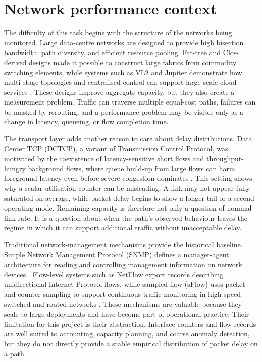 \section{Network performance context}

The difficulty of this task begins with the structure of the networks being monitored. Large data-centre networks are designed to provide high bisection bandwidth, path diversity, and efficient resource pooling. Fat-tree and Clos-derived designs made it possible to construct large fabrics from commodity switching elements, while systems such as VL2 and Jupiter demonstrate how multi-stage topologies and centralised control can support large-scale cloud services \cite{alFaresFatTree,greenbergVl2,singhJupiter}. These designs improve aggregate capacity, but they also create a measurement problem. Traffic can traverse multiple equal-cost paths, failures can be masked by rerouting, and a performance problem may be visible only as a change in latency, queueing, or flow completion time.

The transport layer adds another reason to care about delay distributions. Data Center TCP (DCTCP), a variant of Transmission Control Protocol, was motivated by the coexistence of latency-sensitive short flows and throughput-hungry background flows, where queue build-up from large flows can harm foreground latency even before severe congestion dominates \cite{alizadehDctcp}. This setting shows why a scalar utilisation counter can be misleading. A link may not appear fully saturated on average, while packet delay begins to show a longer tail or a second operating mode. Remaining capacity is therefore not only a question of nominal link rate. It is a question about when the path's observed behaviour leaves the regime in which it can support additional traffic without unacceptable delay.

Traditional network-management mechanisms provide the historical baseline. Simple Network Management Protocol (SNMP) defines a manager-agent architecture for reading and controlling management information on network devices \cite{harringtonSnmp}. Flow-level systems such as NetFlow export records describing unidirectional Internet Protocol flows, while sampled flow (sFlow) uses packet and counter sampling to support continuous traffic monitoring in high-speed switched and routed networks \cite{claiseNetflow,phaalSflow}. These mechanisms are valuable because they scale to large deployments and have become part of operational practice. Their limitation for this project is their abstraction. Interface counters and flow records are well suited to accounting, capacity planning, and coarse anomaly detection, but they do not directly provide a stable empirical distribution of packet delay on a path.

